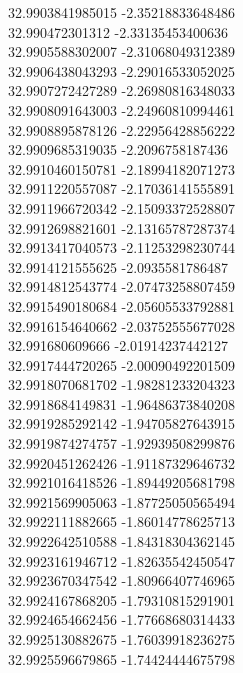 {32.9903841985015	-2.35218833648486\\
32.990472301312	-2.33135453400636\\
32.9905588302007	-2.31068049312389\\
32.9906438043293	-2.29016533052025\\
32.9907272427289	-2.26980816348033\\
32.9908091643003	-2.24960810994461\\
32.9908895878126	-2.22956428856222\\
32.9909685319035	-2.2096758187436\\
32.9910460150781	-2.18994182071273\\
32.9911220557087	-2.17036141555891\\
32.9911966720342	-2.15093372528807\\
32.9912698821601	-2.13165787287374\\
32.9913417040573	-2.11253298230744\\
32.9914121555625	-2.0935581786487\\
32.9914812543774	-2.07473258807459\\
32.9915490180684	-2.05605533792881\\
32.9916154640662	-2.03752555677028\\
32.991680609666	-2.01914237442127\\
32.9917444720265	-2.00090492201509\\
32.9918070681702	-1.98281233204323\\
32.9918684149831	-1.96486373840208\\
32.9919285292142	-1.94705827643915\\
32.9919874274757	-1.92939508299876\\
32.9920451262426	-1.91187329646732\\
32.9921016418526	-1.89449205681798\\
32.9921569905063	-1.87725050565494\\
32.9922111882665	-1.86014778625713\\
32.9922642510588	-1.84318304362145\\
32.9923161946712	-1.82635542450547\\
32.9923670347542	-1.80966407746965\\
32.9924167868205	-1.79310815291901\\
32.9924654662456	-1.77668680314433\\
32.9925130882675	-1.76039918236275\\
32.9925596679865	-1.74424444675798\\
}
